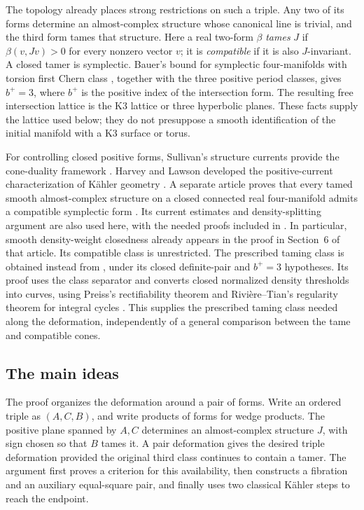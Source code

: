 The topology already places strong restrictions on such a triple.
Any two of its forms determine an almost-complex structure whose
canonical line is trivial, and the third form tames that structure.
Here a real two-form $\beta$ \emph{tames} $J$ if
$\beta(v,Jv)>0$ for every nonzero vector $v$; it is
\emph{compatible} if it is also $J$-invariant. A closed tamer is
symplectic. Bauer's bound for symplectic four-manifolds with torsion
first Chern class \cite[Corollary~1.2]{Bauer2008}, together with the
three positive period classes, gives $b^+=3$, where $b^+$ is the
positive index of the intersection form. The resulting free
intersection lattice is the K3 lattice or three hyperbolic planes.
These facts supply the lattice used below; they do not presuppose a
smooth identification of the initial manifold with a K3 surface or torus.

For controlling closed positive forms, Sullivan's structure currents
provide the cone-duality framework \cite{Sullivan1976}.
Harvey and Lawson developed the positive-current characterization of
K\"ahler geometry \cite{HarveyLawson1983}.
A separate article proves that every tamed smooth
almost-complex structure on a closed connected real four-manifold admits a compatible
symplectic form \cite[Theorem~1.1]{OpenAITaming2026}. Its current
estimates and density-splitting argument are also used here, with the
needed proofs included in .
In particular, smooth density-weight closedness already appears in
the proof in Section~6 of that article. Its compatible class is
unrestricted. The prescribed taming class is obtained instead from
, under its closed definite-pair and $b^+=3$
hypotheses. Its proof uses the class separator and converts closed
normalized density thresholds into curves, using Preiss's
rectifiability theorem and Rivi\`ere--Tian's regularity theorem for
integral cycles \cite{Preiss1987,RiviereTian2009}. This supplies the
prescribed taming class needed along the deformation, independently of
a general comparison between the tame and compatible cones.

\subsection{The main ideas}

The proof organizes the deformation around a pair of forms. Write an
ordered triple as $(A,C,B)$, and write products of forms for wedge
products. The positive plane spanned by $A,C$
determines an almost-complex structure $J$, with sign chosen so that
$B$ tames it. A pair deformation gives the desired triple deformation
provided the original third class continues to contain a tamer.
The argument first proves a criterion for this availability, then
constructs a fibration and an auxiliary equal-square pair, and finally
uses two classical K\"ahler steps to reach the endpoint.

